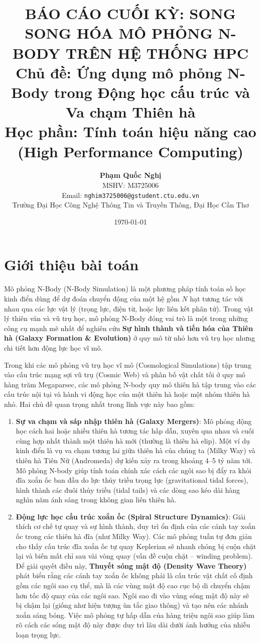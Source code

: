 \documentclass[12pt]{article}
\title{
    \textbf{BÁO CÁO CUỐI KỲ: SONG SONG HÓA MÔ PHỎNG N-BODY TRÊN HỆ THỐNG HPC}\\
    \large \textbf{Chủ đề: Ứng dụng mô phỏng N-Body trong Động học cấu trúc và Va chạm Thiên hà}\\
    \small Học phần: Tính toán hiệu năng cao (High Performance Computing)
}
\author{
    \textbf{Phạm Quốc Nghị} \\
    MSHV: M3725006 \\
    Email: \texttt{nghim3725006@gstudent.ctu.edu.vn} \\
    \small Trường Đại Học Công Nghệ Thông Tin và Truyền Thông, Đại Học Cần Thơ
}
\date{\today}
\begin{document}
\maketitle

\tableofcontents
\newpage

\section{Giới thiệu bài toán}
\label{sec:intro}

Mô phỏng N-Body (N-Body Simulation) là một phương pháp tính toán số học kinh điển dùng để dự đoán chuyển động của một hệ gồm $N$ hạt tương tác với nhau qua các lực vật lý (trọng lực, điện từ, hoặc lực liên kết phân tử). Trong vật lý thiên văn và vũ trụ học, mô phỏng N-Body đóng vai trò là một trong những công cụ mạnh mẽ nhất để nghiên cứu \textbf{Sự hình thành và tiến hóa của Thiên hà (Galaxy Formation \& Evolution)} ở quy mô từ nhỏ hơn vũ trụ học nhưng chi tiết hơn động lực học vĩ mô. 

Trong khi các mô phỏng vũ trụ học vĩ mô (Cosmological Simulations) tập trung vào cấu trúc mạng sợi vũ trụ (Cosmic Web) và phân bố vật chất tối ở quy mô hàng trăm Megaparsec, các mô phỏng N-body quy mô thiên hà tập trung vào các cấu trúc nội tại và hành vi động học của một thiên hà hoặc một nhóm thiên hà nhỏ. Hai chủ đề quan trọng nhất trong lĩnh vực này bao gồm:

\begin{enumerate}
    \item \textbf{Sự va chạm và sáp nhập thiên hà (Galaxy Mergers)}: Mô phỏng động học cách hai hoặc nhiều thiên hà tương tác hấp dẫn, xuyên qua nhau và cuối cùng hợp nhất thành một thiên hà mới (thường là thiên hà elip). Một ví dụ kinh điển là vụ va chạm tương lai giữa thiên hà của chúng ta (Milky Way) và thiên hà Tiên Nữ (Andromeda) dự kiến xảy ra trong khoảng 4--5 tỷ năm tới. Mô phỏng N-body giúp tính toán chính xác cách các ngôi sao bị đẩy ra khỏi đĩa xoắn ốc ban đầu do lực thủy triều trọng lực (gravitational tidal forces), hình thành các đuôi thủy triều (tidal tails) và các dòng sao kéo dài hàng nghìn năm ánh sáng trong không gian liên thiên hà.
    
    \item \textbf{Động lực học cấu trúc xoắn ốc (Spiral Structure Dynamics)}: Giải thích cơ chế tự quay và sự hình thành, duy trì ổn định của các cánh tay xoắn ốc trong các thiên hà đĩa (như Milky Way). Các mô phỏng tuần tự đơn giản cho thấy cấu trúc đĩa xoắn ốc tự quay Keplerian sẽ nhanh chóng bị cuộn chặt lại và biến mất chỉ sau vài vòng quay (vấn đề cuộn chặt -- winding problem). Để giải quyết điều này, \textbf{Thuyết sóng mật độ (Density Wave Theory)} phát biểu rằng các cánh tay xoắn ốc không phải là cấu trúc vật chất cố định gồm các ngôi sao cụ thể, mà là các vùng mật độ cao cục bộ di chuyển chậm hơn tốc độ quay của các ngôi sao. Ngôi sao đi vào vùng sóng mật độ này sẽ bị chậm lại (giống như hiện tượng ùn tắc giao thông) và tạo nên các nhánh xoắn sáng bóng. Việc mô phỏng tự hấp dẫn của hàng triệu ngôi sao giúp làm rõ cách các sóng mật độ này được duy trì lâu dài dưới ảnh hưởng của nhiễu loạn trọng lực.
\end{enumerate}
\end{document}

